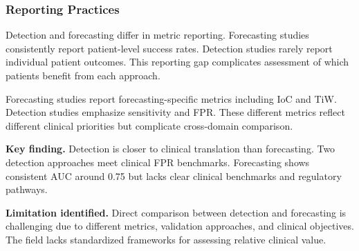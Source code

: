 \subsubsection{Reporting Practices}

Detection and forecasting differ in metric reporting. Forecasting studies consistently report patient-level success rates. Detection studies rarely report individual patient outcomes. This reporting gap complicates assessment of which patients benefit from each approach.

Forecasting studies report forecasting-specific metrics including IoC and TiW. Detection studies emphasize sensitivity and FPR. These different metrics reflect different clinical priorities but complicate cross-domain comparison.

\textbf{Key finding.} Detection is closer to clinical translation than forecasting. Two detection approaches meet clinical FPR benchmarks. Forecasting shows consistent AUC around 0.75 but lacks clear clinical benchmarks and regulatory pathways.

\textbf{Limitation identified.} Direct comparison between detection and forecasting is challenging due to different metrics, validation approaches, and clinical objectives. The field lacks standardized frameworks for assessing relative clinical value.
